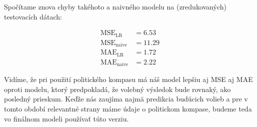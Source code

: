\documentclass[main.tex]{subfiles}
\begin{document}
Spočítame znova chyby takéhoto a naivného modelu na (zredukovaných) testovacích dátach:

\begin{align*}
	\operatorname{MSE}_{\operatorname{LR}} &= 6.53 \\
	\operatorname{MSE}_{\operatorname{naive}} &= 11.29 \\
	\operatorname{MAE}_{\operatorname{LR}} &= 1.72 \\
	\operatorname{MAE}_{\operatorname{naive}} &= 2.22
\end{align*}

Vidíme, že pri použití politického kompasu má náš model lepšiu aj MSE aj MAE oproti modelu, ktorý predpokladá, že volebný výsledok bude rovnaký, ako posledný prieskum. Keďže nás zaujíma najmä predikcia budúcich volieb a pre v tomto období relevantné strany máme údaje o politickom kompase, budeme teda vo finálnom modeli používať túto verziu.
\end{document}

